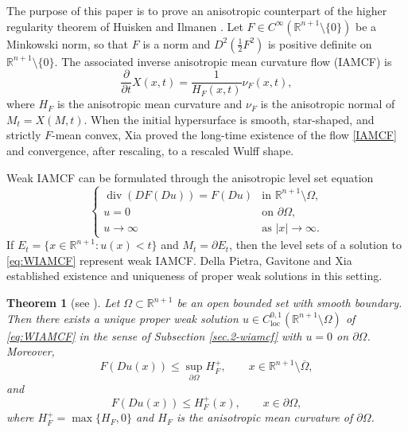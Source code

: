 \documentclass[11pt,reqno]{amsart}
\newtheorem{theorem}[proposition]{Theorem}
\theoremstyle{definition}
\theoremstyle{remark}
\numberwithin{equation}{section}
\begin{document}
	The purpose of this paper is to prove an anisotropic counterpart of the higher regularity theorem of Huisken and Ilmanen \cite{HI08}. Let $F\in C^{\infty}(\mathbb{R}^{n+1}\setminus\{0\})$ be a Minkowski norm, so that $F$ is a norm and $D^2(\frac{1}{2}F^2)$ is positive definite on $\mathbb{R}^{n+1}\setminus\{0\}$. The associated inverse anisotropic mean curvature flow (IAMCF) is
	\begin{equation}
		\label{IAMCF}
		\frac{\partial }{\partial t} X(x,t)=\frac{1}{H_F(x,t)}\nu_F(x,t),
	\end{equation}
	where $H_F$ is the anisotropic mean curvature and $\nu_F$ is the anisotropic normal of $M_t=X(M,t)$. When the initial hypersurface is smooth, star-shaped, and strictly $F$-mean convex, Xia \cite{Xia17} proved the long-time existence of the flow \eqref{IAMCF} and convergence, after rescaling, to a rescaled Wulff shape.
	
	Weak IAMCF can be formulated through the anisotropic level set equation
	\begin{equation}
	\label{eq:WIAMCF}
	\begin{cases}
		\operatorname{div}(DF(Du))=F(Du) & \text{in } \mathbb{R}^{n+1}\setminus\Omega, \\
		u=0 & \text{on } \partial\Omega, \\
		u\to\infty & \text{as } |x|\to\infty.
	\end{cases}
	\end{equation}
	If $E_t=\{x\in\mathbb{R}^{n+1}:u(x)<t\}$ and $M_t=\partial E_t$, then the level sets of a solution to \eqref{eq:WIAMCF} represent weak IAMCF. Della Pietra, Gavitone and Xia \cite{DGX23} established existence and uniqueness of proper weak solutions in this setting.
	
	\begin{theorem}[see {\cite[Theorem 1.1]{DGX23}}]
		\label{thmwiamcf}
		Let $\Omega\subset\mathbb{R}^{n+1}$ be an open bounded set with smooth boundary. Then there exists a unique proper weak solution $u\in C^{0,1}_{\mathrm{loc}}(\mathbb{R}^{n+1}\setminus \Omega)$ of \eqref{eq:WIAMCF} in the sense of Subsection \ref{sec.2-wiamcf} with $u=0$ on $\partial\Omega$. 
Moreover,
	\begin{equation*}
			F(Du(x))\leq \sup_{\partial\Omega}H_F^+, \qquad x\in \mathbb R^{n+1}\setminus\overline\Omega,
		\end{equation*}
		and
		\begin{equation*}
			F(Du(x))\leq H_F^+(x), \qquad x\in\partial\Omega,
		\end{equation*}
		where $H_F^+=\max\{H_F,0\}$ and $H_F$ is the anisotropic mean curvature of $\partial\Omega$.
	\end{theorem}
	
\end{document}
